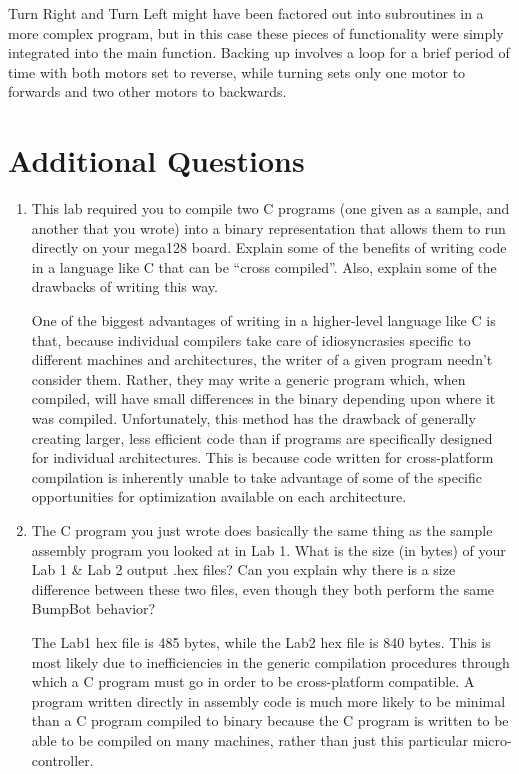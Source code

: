 \documentclass[12pt,letterpaper]{article}
\begin{document}
Turn Right and Turn Left might have been factored out into subroutines in a more complex program, but in this case these pieces of functionality were simply integrated into the main function. Backing up involves a loop for a brief period of time with both motors set to reverse, while turning sets only one motor to forwards and two other motors to backwards.

\section{Additional Questions}
\begin{enumerate}
    \item
    This lab required you to compile two C programs (one given as a sample,
    and another that you wrote) into a binary representation that allows them to
    run directly on your mega128 board. Explain some of the benefits of writing
    code in a language like C that can be “cross compiled”. Also, explain some
    of the drawbacks of writing this way.

    One of the biggest advantages of writing in a higher-level language like C is that, because individual compilers take care of idiosyncrasies specific to different machines and architectures, the writer of a given program needn't consider them. Rather, they may write a generic program which, when compiled, will have small differences in the binary depending upon where it was compiled. Unfortunately, this method has the drawback of generally creating larger, less efficient code than if programs are specifically designed for individual architectures. This is because code written for cross-platform compilation is inherently unable to take advantage of some of the specific opportunities for optimization available on each architecture.

    \item
    The C program you just wrote does basically the same thing as the sample
    assembly program you looked at in Lab 1. What is the size (in bytes) of
    your Lab 1 \& Lab 2 output .hex files? Can you explain why there is a size
    difference between these two files, even though they both perform the same
    BumpBot behavior?

    The Lab1 hex file is 485 bytes, while the Lab2 hex file is 840 bytes. This is most likely due to inefficiencies in the generic compilation procedures through which a C program must go in order to be cross-platform compatible. A program written directly in assembly code is much more likely to be minimal than a C program compiled to binary because the C program is written to be able to be compiled on many machines, rather than just this particular micro-controller.

\end{enumerate}
\end{document}
